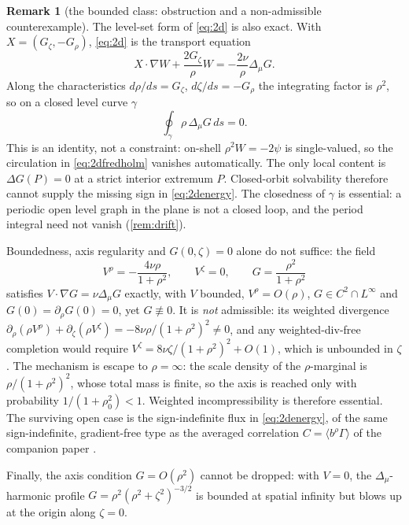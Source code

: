 \documentclass[11pt]{article}
\theoremstyle{definition}
\newtheorem{remark}[theorem]{Remark}
\newcommand{\grad}{\nabla}
\begin{document}
\begin{remark}[the bounded class: obstruction and a non-admissible counterexample]
The level-set form of \eqref{eq:2d} is also exact. With
$X=(G_\zeta,-G_\rho)$, \eqref{eq:2d} is the transport equation
\begin{equation}\label{eq:2dtransport}
X\cdot\grad W+\frac{2G_\zeta}{\rho}W
=-\frac{2\nu}{\rho}\Delta_\mu G .
\end{equation}
Along the characteristics $d\rho/ds=G_\zeta$, $d\zeta/ds=-G_\rho$ the
integrating factor is $\rho^2$, so on a closed level curve $\gamma$
\begin{equation}\label{eq:2dfredholm}
\oint_\gamma\rho\,\Delta_\mu G\,ds=0 .
\end{equation}
This is an identity, not a constraint: on-shell $\rho^2W=-2\psi$ is
single-valued, so the circulation in \eqref{eq:2dfredholm} vanishes
automatically. The only local content is $\Delta G(P)=0$ at a strict interior
extremum $P$. Closed-orbit solvability therefore cannot supply the missing
sign in \eqref{eq:2denergy}. The closedness of $\gamma$ is essential: a
periodic open level graph in the plane is not a closed loop, and the period
integral need not vanish (\cref{rem:drift}).

Boundedness, axis regularity and $G(0,\zeta)=0$ alone do not suffice: the
field
\begin{equation}\label{eq:2dcounter}
V^\rho=-\frac{4\nu\rho}{1+\rho^2},\qquad V^\zeta=0,\qquad
G=\frac{\rho^2}{1+\rho^2}
\end{equation}
satisfies $V\cdot\grad G=\nu\Delta_\mu G$ exactly, with $V$ bounded,
$V^\rho=O(\rho)$, $G\in C^2\cap L^\infty$ and
$G(0)=\partial_\rho G(0)=0$, yet $G\not\equiv0$. It is \emph{not}
admissible: its weighted divergence
$\partial_\rho(\rho V^\rho)+\partial_\zeta(\rho V^\zeta)
=-8\nu\rho/(1+\rho^2)^2\ne0$, and any
weighted-div-free completion would require
$V^\zeta=8\nu\zeta/(1+\rho^2)^2+O(1)$, which is unbounded in $\zeta$. The
mechanism is escape to $\rho=\infty$: the scale density of the
$\rho$-marginal is $\rho/(1+\rho^2)^2$, whose total mass is finite, so the
axis is reached only with probability $1/(1+\rho_0^2)<1$. Weighted
incompressibility is therefore essential. The surviving open case is the
sign-indefinite flux in \eqref{eq:2denergy}, of the same sign-indefinite,
gradient-free type as the averaged correlation
$C=\langle b^\rho\Gamma\rangle$ of the companion paper \cite{companion}.

Finally, the axis condition $G=O(\rho^2)$ cannot be dropped: with $V=0$,
the $\Delta_\mu$-harmonic profile
$G=\rho^2(\rho^2+\zeta^2)^{-3/2}$ is bounded at spatial infinity but blows
up at the origin along $\zeta=0$.
\end{remark}
\end{document}
